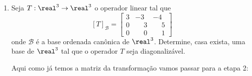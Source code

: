 \begin{exemplo}
\begin{enumerate}[label={\arabic*})]
\begin{solucao}
\begin{itemize}
                \item para $\lambda = i$ temos:
                \[
                    [T - iI_2]_\mathcal{B} = \begin{bmatrix} -i & -1\\\phantom{-}1 & -i\end{bmatrix}
                \]
                e assim $(x,y) \in \aut_T(i)$ se, e s\'o se,
                \[
                    \begin{bmatrix} -i & -1\\\phantom{-}1 & -i\end{bmatrix} \begin{bmatrix} x\\y\end{bmatrix}     = \begin{bmatrix} 0\\0\end{bmatrix}.
                \]
                Resolvendo esse sistema, obtemos $x = iy$. Logo
                \[
                    \aut_T(i) = \{(iy,y) \in \complex^2 \mid y \in \complex\} = [(i,1)].
                \]
                Assim, $\mathcal{B}_1 = \{(i,1)\}$ é uma base de $\aut_T(i)$ e então $\dim_\complex\aut_T(i) = 1$.
            \end{itemize}
            Agora o conjunto $\mathcal{D} = \mathcal{B}_1 \cup \mathcal{B}_2 = \{(-i,1); (i,1)\}$ é uma base de $\complex^2$ e $T$ é diagonalizável. Nesta base temos
            \[
                [T]_\mathcal{B} = \begin{bmatrix} -i & 0\\\phantom{-}0 & i\end{bmatrix}.
            \]
        \end{solucao}
        \item Seja $T : \real^3 \to \real^3$ o operador linear tal que
        \[
            [T]_\mathcal{B} = \begin{bmatrix}
                                3 & -3 & -4\\
                                0 & \phantom{-}3 & \phantom{-}5\\
                                0 & \phantom{-}0 & \phantom{-}1
                            \end{bmatrix}
        \]
        onde $\mathcal{B}$ é a base ordenada canônica de $\real^3$. Determine, casa exista, uma base de $\real^3$ tal que o operador $T$ seja diagonalizável.
        \begin{solucao}
            Aqui como já temos a matriz da transformação vamos passar para a etapa 2:

\end{solucao}
\end{enumerate}
\end{exemplo}
